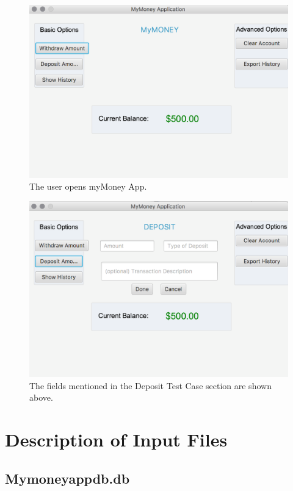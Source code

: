 \documentclass[12pt]{article}
\begin{document}
\begin{figure}
  \includegraphics[width=\linewidth]{open_app.png}
  \caption{The user opens myMoney App.}
\end{figure}

\begin{figure}
  \includegraphics[width=\linewidth]{deposit_click.png}
  \caption{The fields mentioned in the Deposit Test Case section are shown above.}
\end{figure}

\appendix

\section{Description of Input Files}

\subsection{Mymoneyappdb.db}
\end{document}
